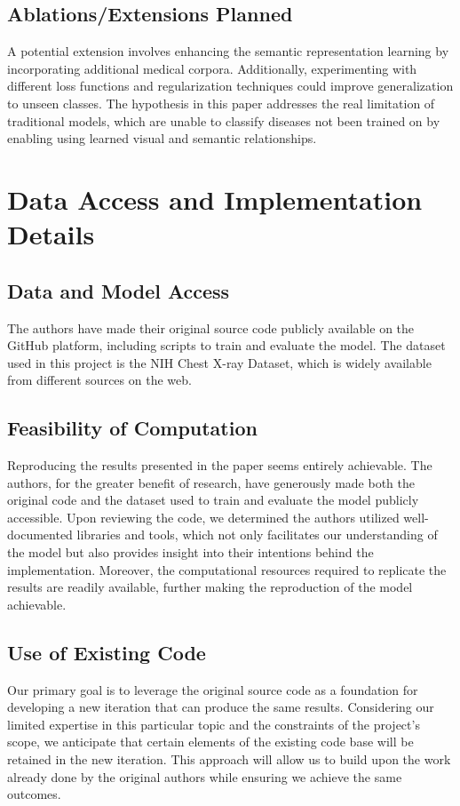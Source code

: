 \documentclass[letterpaper]{article} %
\begin{document}
\subsection{Ablations/Extensions Planned}

A potential extension involves enhancing the semantic representation learning by
incorporating additional medical corpora. Additionally, experimenting with different
loss functions and regularization techniques could improve generalization to
unseen classes. The hypothesis in this paper addresses the real limitation of
traditional models, which are unable to classify diseases not been trained on by
enabling using learned visual and semantic relationships.

\section{Data Access and Implementation Details}

\subsection{Data and Model Access}

The authors have made their original source code publicly available on the GitHub
platform, including scripts to train and evaluate the model. The dataset used in this
project is the NIH Chest X-ray Dataset, which is widely available from different
sources on the web.

\subsection{Feasibility of Computation}

Reproducing the results presented in the paper seems entirely achievable. The authors, for the greater benefit of research, have generously made both the original code and the dataset used to train and evaluate the model publicly accessible. Upon reviewing the code, we determined the authors utilized well-documented libraries and tools, which not only facilitates our understanding of the model but also provides insight into their intentions behind the implementation. Moreover, the computational resources required to replicate the results are readily available, further making the reproduction of the model achievable.

\subsection{Use of Existing Code}

Our primary goal is to leverage the original source code as a foundation for developing a new iteration that can produce the same results. Considering our limited expertise in this particular topic and the constraints of the project's scope, we anticipate that certain elements of the existing code base will be retained in the new iteration. This approach will allow us to build upon the work already done by the original authors while ensuring we achieve the same outcomes.

% 
\end{document}

